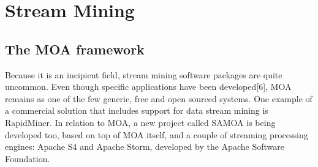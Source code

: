 \section{Stream Mining}
\label{State::StreamMining}

\subsection{The MOA framework}
\label{State::StreamMining::MOA}

Because it is an incipient field, stream mining software packages are quite uncommon. Even though specific applications have been developed[6], MOA remains as one of the few generic, free and open sourced systems. One example of a commercial solution that includes support for data stream mining is RapidMiner.
In relation to MOA, a new project called SAMOA is being developed too, based on top of MOA itself, and a couple of streaming processing engines: Apache S4 and Apache Storm, developed by the Apache Software Foundation.